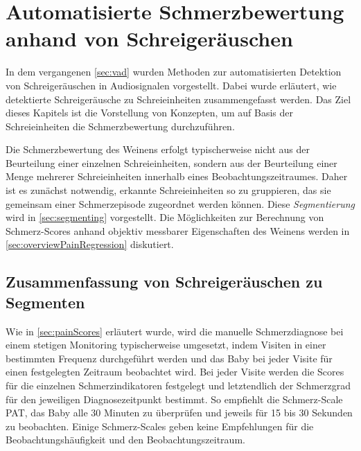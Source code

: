 \chapter{Automatisierte Schmerzbewertung anhand von Schreigeräuschen}
\label{sec:deduction}

In dem vergangenen \autoref{sec:vad} wurden Methoden zur automatisierten Detektion von Schreigeräuschen in Audiosignalen vorgestellt. Dabei wurde erläutert, wie detektierte Schreigeräusche zu Schreieinheiten zusammengefasst werden. Das Ziel dieses Kapitels ist die Vorstellung von Konzepten, um auf Basis der Schreieinheiten die Schmerzbewertung durchzuführen. 

Die Schmerzbewertung des Weinens erfolgt typischerweise nicht aus der Beurteilung einer einzelnen Schreieinheiten, sondern aus der Beurteilung einer Menge mehrerer Schreieinheiten innerhalb eines Beobachtungszeitraumes. Daher ist es zunächst notwendig, erkannte Schreieinheiten so zu gruppieren, das sie gemeinsam einer Schmerzepisode zugeordnet werden können. Diese \emph{Segmentierung} wird in \autoref{sec:segmenting} vorgestellt. Die Möglichkeiten zur Berechnung von Schmerz-Scores anhand objektiv messbarer Eigenschaften des Weinens werden in \autoref{sec:overviewPainRegression} diskutiert.

\section{Zusammenfassung von Schreigeräuschen zu Segmenten}
\label{sec:segmenting}

Wie in \autoref{sec:painScores} erläutert wurde, wird die manuelle Schmerzdiagnose bei einem stetigen Monitoring typischerweise umgesetzt, indem Visiten in einer bestimmten Frequenz durchgeführt werden und das Baby bei jeder Visite für einen festgelegten Zeitraum beobachtet wird. Bei jeder Visite werden die Scores für die einzelnen Schmerzindikatoren festgelegt und letztendlich der Schmerzgrad für den jeweiligen Diagnosezeitpunkt bestimmt. So empfiehlt die Schmerz-Scale PAT, das Baby alle 30 Minuten zu überprüfen und jeweils für 15 bis 30 Sekunden zu beobachten. Einige Schmerz-Scales geben keine Empfehlungen für die Beobachtungshäufigkeit und den Beobachtungszeitraum. 

